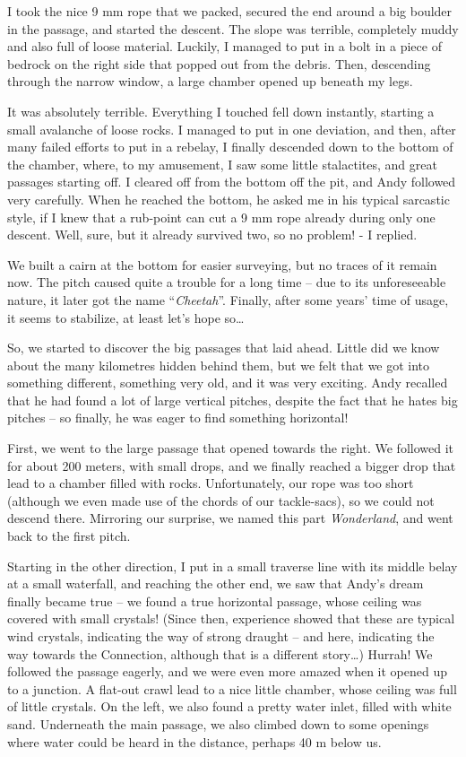I took the nice 9 mm rope that we packed, secured the end around a big
boulder in the passage, and started the descent. The slope was terrible,
completely muddy and also full of loose material. Luckily, I managed to
put in a bolt in a piece of bedrock on the right side that popped out
from the debris. Then, descending through the narrow window, a large
chamber opened up beneath my legs.

It was absolutely terrible. Everything I touched fell down instantly,
starting a small avalanche of loose rocks. I managed to put in one
deviation, and then, after many failed efforts to put in a rebelay, I
finally descended down to the bottom of the chamber, where, to my
amusement, I saw some little stalactites, and great passages starting
off. I cleared off from the bottom off the pit, and Andy followed very
carefully. When he reached the bottom, he asked me in his typical
sarcastic style, if I knew that a rub-point can cut a 9 mm rope already
during only one descent. Well, sure, but it already survived two, so no
problem! - I replied.

We built a cairn at the bottom for easier surveying, but no traces of it
remain now. The pitch caused quite a trouble for a long time -- due to
its unforeseeable nature, it later got the name ``\emph{Cheetah}''.
Finally, after some years' time of usage, it seems to stabilize, at
least let's hope so\ldots{}

So, we started to discover the big passages that laid ahead. Little did
we know about the many kilometres hidden behind them, but we felt that
we got into something different, something very old, and it was very
exciting. Andy recalled that he had found a lot of large vertical
pitches, despite the fact that he hates big pitches -- so finally, he
was eager to find something horizontal!

First, we went to the large passage that opened towards the right. We
followed it for about 200 meters, with small drops, and we finally
reached a bigger drop that lead to a chamber filled with rocks.
Unfortunately, our rope was too short (although we even made use of the
chords of our tackle-sacs), so we could not descend there. Mirroring our
surprise, we named this part \emph{Wonderland}, and went back to the
first pitch.

Starting in the other direction, I put in a small traverse line with its
middle belay at a small waterfall, and reaching the other end, we saw
that Andy's dream finally became true -- we found a true horizontal
passage, whose ceiling was covered with small crystals! (Since then,
experience showed that these are typical wind crystals, indicating the
way of strong draught -- and here, indicating the way towards the
Connection, although that is a different story\ldots{}) Hurrah! We
followed the passage eagerly, and we were even more amazed when it
opened up to a junction. A flat-out crawl lead to a nice little chamber,
whose ceiling was full of little crystals. On the left, we also found a
pretty water inlet, filled with white sand. Underneath the main passage,
we also climbed down to some openings where water could be heard in the
distance, perhaps 40 m below us.

